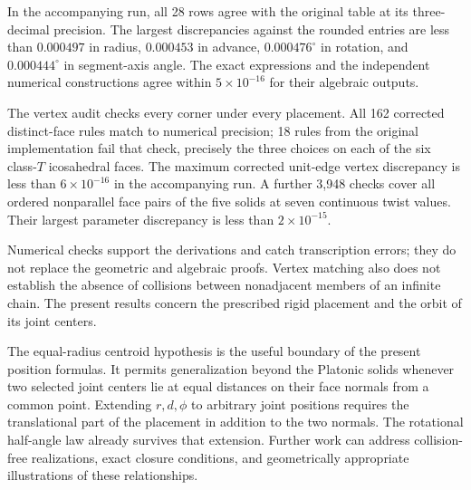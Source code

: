 \documentclass[11pt]{article}
\theoremstyle{definition}
\newcommand{\degc}{^{\circ}}
\begin{document}
In the accompanying run, all 28 rows agree with the original table at its
three-decimal precision. The largest discrepancies against the rounded
entries are less than $0.000497$ in radius, $0.000453$ in advance,
$0.000476\degc$ in rotation, and $0.000444\degc$ in segment-axis angle.
The exact expressions and the independent numerical constructions agree
within $5\times10^{-16}$ for their algebraic outputs.

The vertex audit checks every corner under every placement. All 162
corrected distinct-face rules match to numerical precision; 18 rules from
the original implementation fail that check, precisely the three choices
on each of the six class-$T$ icosahedral faces. The maximum corrected
unit-edge vertex discrepancy is less than $6\times10^{-16}$ in the
accompanying run. A further 3,948 checks cover all ordered nonparallel face
pairs of the five solids at seven continuous twist values. Their largest
parameter discrepancy is less than $2\times10^{-15}$.

Numerical checks support the derivations and catch transcription errors;
they do not replace the geometric and algebraic proofs. Vertex matching
also does not establish the absence of collisions between nonadjacent
members of an infinite chain. The present results concern the prescribed
rigid placement and the orbit of its joint centers.

The equal-radius centroid hypothesis is the useful boundary of the present
position formulas. It permits generalization beyond the Platonic solids
whenever two selected joint centers lie at equal distances on their face
normals from a common point. Extending $r,d,\phi$ to arbitrary joint
positions requires the translational part of the placement in addition to
the two normals. The rotational half-angle law already survives that
extension. Further work can address collision-free realizations, exact
closure conditions, and geometrically appropriate illustrations of these
relationships.

\appendix
\end{document}
